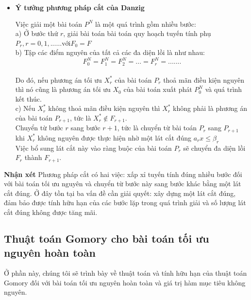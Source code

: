 \documentclass[12pt,a4paper]{report}
\begin{document}
\begin{itemize}
\begin{figure}[h]
    \end{figure}
\item \textbf{Ý tưởng phương pháp cắt của Danzig}
    
    Việc giải một bài toán $P^N$ là một quá trình gồm nhiều bước:\\
a) Ở bước thứ $r$,  giải bài toán bài toán quy hoạch tuyến tính phụ 
 $P_r, r = 0,1,... 
… \text{với}   F_0=F $\\
b) Tập các điểm  nguyên của tất cả các đa diện lồi là như nhau:
$$F_0^N=F_1^N=F_2^N=...=F_r^N=.......$$\\
Do đó, nếu phương án tối ưu $X^*_r$ của bài toán $P_r$ thoả mãn điều kiện nguyên thì nó cũng là phương án tối ưu $X_0$ của bài toán xuất phát $P^N_0$ và quá trình kết thúc.\\
c)  Nếu $X^*_r$ không thoả mãn điều kiện nguyên thì $X^*_r$ không phải là 
phương án của bài toán $P_{r+1}$, tức là $X_r^*\notin F_{r+1}$.\\Chuyển từ bước $r$ sang bước $r+1$, tức là chuyển từ bài toán $P_r$ sang 
 $P_{r+1}$ khi $X^*_r$ không nguyên được thực hiện nhờ một lát cắt đúng $a_rx \le \beta_r$\\
Việc bổ sung lát cắt này vào ràng buộc của bài toán $P_r$ sẽ chuyển đa diện lồi $F_r$ thành $F_{r+1}$.\\
    
\end{itemize}
\textbf{Nhận xét}
    Phương pháp cắt có hai việc: xấp xỉ tuyến tính đúng nhiều bước đối với bài toán tối ưu nguyên và chuyển từ bước này sang bước khác bằng một lát cắt đúng. Ở đây tồn tại ba vấn đề cần giải quyết: xây dựng một lát cắt đúng, đảm bảo được tính hữu hạn của các bước lặp trong quá trình giải và số lượng lát cắt đúng không được tăng mãi.
    
\subsection{ Thuật toán Gomory cho bài toán tối ưu nguyên hoàn toàn}
Ở phần này, chúng tôi sẽ trình bày về thuật toán và tính hữu hạn của thuật toán Gomory đối với bài toán tối ưu nguyên hoàn toàn và giá trị hàm mục tiêu không nguyên.
\end{document}
